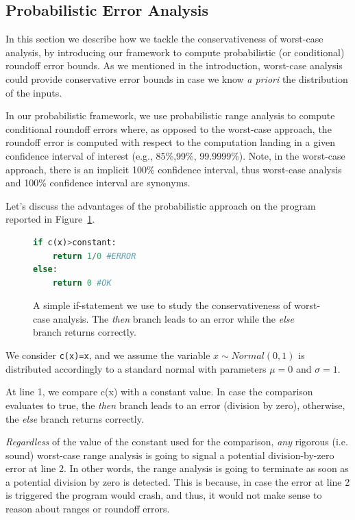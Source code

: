 \subsection{Probabilistic Error Analysis}
\label{sec:prob}
%
In this section we describe how we tackle the conservativeness of worst-case analysis, by introducing our framework to compute probabilistic (or conditional) roundoff error bounds.
%
As we mentioned in the introduction, worst-case analysis could provide conservative error bounds in case we know \emph{a priori} the distribution of the inputs. 
%
%

In our probabilistic framework, we use probabilistic range analysis to compute conditional roundoff errors where, as opposed to the worst-case approach, the roundoff error is computed with respect to the computation landing in a given confidence interval of interest (e.g., 85\%,99\%, 99.9999\%).
%
Note, in the worst-case approach, there is an implicit 100\% confidence interval, thus worst-case analysis and 100\% confidence interval are synonyms.
%

%
Let's discuss the advantages of the probabilistic approach on the program reported in Figure~\ref{fig:prob}.
%
\begin{figure}[h!]
	\begin{lstlisting}[frame=single, language=Python]
if c(x)>constant:
	return 1/0 #ERROR
else:
	return 0 #OK
	\end{lstlisting}
	\caption{A simple if-statement we use to study the conservativeness of worst-case analysis. The \emph{then} branch leads to an error while the \emph{else} branch returns correctly.}
	\label{fig:prob}
\end{figure}
%

We consider \lstinline{c(x)=x}, and we assume the variable $x\sim Normal(0,1)$ is distributed accordingly to a standard normal with parameters $\mu = 0$ and $\sigma = 1$.
%

At line 1, we compare c(x) with a constant value.
%
In case the comparison evaluates to true, the \emph{then} branch leads to an error (division by zero), otherwise, the \emph{else} branch returns correctly.
%

\emph{Regardless} of the value of the constant used for the comparison, \emph{any} rigorous (i.e. sound) worst-case range analysis is going to signal a potential division-by-zero error at line 2.
%
In other words, the range analysis is going to terminate as soon as a potential division by zero is detected.
%
This is because, in case the error at line 2 is triggered the program would crash, and thus, it would not make sense to reason about ranges or roundoff errors.

